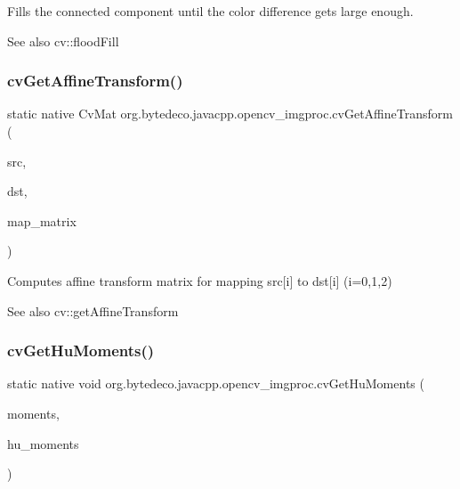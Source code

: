 Fills the connected component until the color difference gets large enough. 

\begin{DoxySeeAlso}{See also}
cv\+::flood\+Fill 
\end{DoxySeeAlso}
\mbox{\label{group__imgproc__c_ga6deb33dc741b5402e8660d553cf299c3}} 
\subsubsection{\texorpdfstring{cv\+Get\+Affine\+Transform()}{cvGetAffineTransform()}}
{\footnotesize\ttfamily static native Cv\+Mat org.\+bytedeco.\+javacpp.\+opencv\+\_\+imgproc.\+cv\+Get\+Affine\+Transform (\begin{DoxyParamCaption}\item[{@Const Cv\+Point2\+D32f}]{src,  }\item[{@Const Cv\+Point2\+D32f}]{dst,  }\item[{Cv\+Mat}]{map\+\_\+matrix }\end{DoxyParamCaption})\hspace{0.3cm}{\ttfamily [static]}}



Computes affine transform matrix for mapping src\mbox{[}i\mbox{]} to dst\mbox{[}i\mbox{]} (i=0,1,2) 

\begin{DoxySeeAlso}{See also}
cv\+::get\+Affine\+Transform 
\end{DoxySeeAlso}
\mbox{\label{group__imgproc__c_ga5cfeea3efab741f8674c0e28172e134f}} 
\subsubsection{\texorpdfstring{cv\+Get\+Hu\+Moments()}{cvGetHuMoments()}}
{\footnotesize\ttfamily static native void org.\+bytedeco.\+javacpp.\+opencv\+\_\+imgproc.\+cv\+Get\+Hu\+Moments (\begin{DoxyParamCaption}\item[{Cv\+Moments}]{moments,  }\item[{Cv\+Hu\+Moments}]{hu\+\_\+moments }\end{DoxyParamCaption})\hspace{0.3cm}{\ttfamily [static]}}



